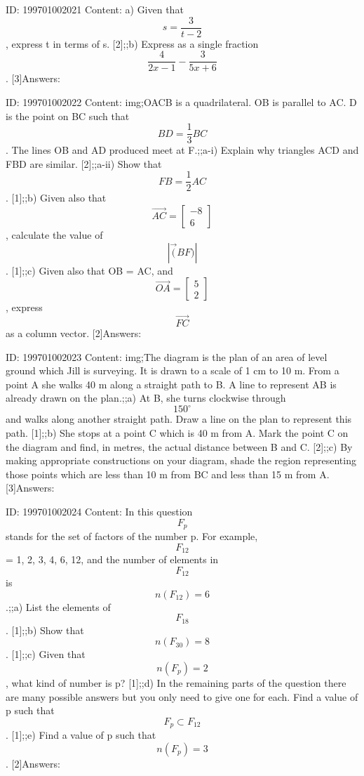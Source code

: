 \documentclass{article}
\begin{document}
ID: 199701002021
Content:
a) Given that $$s=\frac{3}{t-2}$$, express t in terms of s. [2];;b) Express as a single fraction $$\frac{4}{2x-1}-\frac{3}{5x+6}$$. [3]Answers:

ID: 199701002022
Content:
img;OACB is a quadrilateral. OB is parallel to AC. D is the point on BC such that $$BD=\frac{1}{3}BC$$. The lines OB and AD produced meet at F.;;a-i) Explain why triangles ACD and FBD are similar. [2];;a-ii) Show that $$FB=\frac{1}{2}AC$$. [1];;b) Given also that $$\vec{AC}=\begin{bmatrix}-8\\6\end{bmatrix}$$, calculate the value of $$|\vec(BF)|$$. [1];;c) Given also that OB = AC, and $$\vec{OA}=\begin{bmatrix}5\\2\end{bmatrix}$$, express $$\vec{FC}$$ as a column vector. [2]Answers:

ID: 199701002023
Content:
img;The diagram is the plan of an area of level ground which Jill is surveying. It is drawn to a scale of 1 cm to 10 m. From a point A she walks 40 m along a straight path to B. A line to represent AB is already drawn on the plan.;;a) At B, she turns clockwise through $$150^{\circ}$$ and walks along another straight path. Draw a line on the plan to represent this path. [1];;b) She stops at a point C which is 40 m from A. Mark the point C on the diagram and find, in metres, the actual distance between B and C. [2];;c) By making appropriate constructions on your diagram, shade the region representing those points which are less than 10 m from BC and less than 15 m from A. [3]Answers:

ID: 199701002024
Content:
In this question $$F_p$$ stands for the set of factors of the number p. For example, $$F_{12}$$ = {1, 2, 3, 4, 6, 12}, and the number of elements in $$F_{12}$$ is $$n(F_{12}) = 6$$.;;a) List the elements of $$F_{18}$$. [1];;b) Show that $$n(F_{30}) = 8$$. [1];;c) Given that $$n(F_{p}) = 2$$, what kind of number is p? [1];;d) In the remaining parts of the question there are many possible answers but you only need to give one for each. Find a value of p such that $$F_p \subset F_{12}$$. [1];;e) Find a value of p such that $$n(F_p) = 3$$. [2]Answers:
\end{document}
